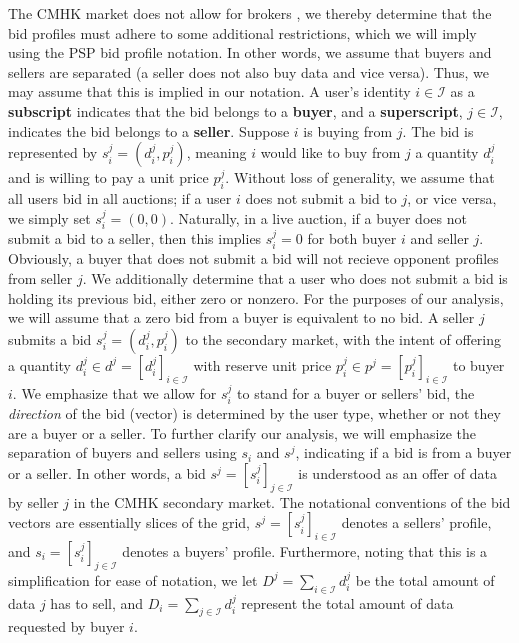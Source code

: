 \documentclass[12pt]{article}
\theoremstyle{definition}
\newcommand{\mcI}{\mathcal{I}}
\begin{document}
\begin{multicols}{2}
The CMHK market does not allow for brokers \cite{cmhk}, we thereby determine that
the bid profiles must adhere to some additional restrictions, which we will
imply using the PSP bid profile notation. In other words, we assume that buyers and sellers are
separated (a seller does not also buy data and vice versa). Thus, we may assume
that this is implied in our notation.
A user's identity $i \in \mcI$ as a \textbf{subscript} indicates that the bid
belongs to a \textbf{buyer}, and a \textbf{superscript}, $j\in\mcI$, indicates
the bid belongs to a \textbf{seller}.
Suppose $i$ is buying from $j$. The bid is represented by $s_i^j = (d_i^j, p_i^j)$, 
meaning $i$ would like to buy from $j$ a quantity $d^j_i$ and is willing to pay
a unit price $p^j_i$. Without loss of generality, we assume that all users bid in all
auctions; if a user $i$ does not submit a bid to $j$, or vice versa, we simply set $s_i^j =
(0,0)$. Naturally, in a live auction, if a buyer does
not submit a bid to a seller, then this implies $s_i^j = 0$ for both buyer $i$
and seller $j$. Obviously, a buyer that does not submit a bid will not recieve opponent profiles from seller
$j$. We additionally determine that a user who does not submit a bid is holding
its previous bid, either zero or nonzero. For the purposes of our analysis, we will assume that a zero bid from a
buyer is equivalent to no bid.
A seller $j$ submits a bid $s_i^j = (d_i^j, p_i^j)$ to the secondary market,
with the intent of offering a
quantity $d_i^j \in d^j = [d_i^j]_{i\in\mcI}$ 
with reserve unit price $p_i^j \in p^j = [p_i^j]_{i\in\mcI}$ to buyer $i$. We emphasize that we allow for $s_i^j$ to
stand for a buyer or sellers' bid, the \emph{direction} of the bid (vector) is determined
by the user type, whether or not they are  a buyer or a seller. 
To further clarify our analysis, we will emphasize the separation of buyers and
sellers using
$s_i$ and $s^j$, indicating if a bid is from a buyer or a seller.
In other words, a bid $s^j =
[s_i^j]_{j\in\mcI}$ is understood as an offer of data by seller $j$ in the CMHK
secondary market. The notational conventions of the bid vectors are essentially 
slices of the grid, $s^j = [s_i^j]_{i\in\mcI}$ denotes a sellers' profile, and $s_i =
[s_i^j]_{j\in\mcI}$ denotes a buyers' profile. 
Furthermore, noting that this is a simplification for ease of notation, we let $D^j = \sum_{i\in\mcI}
d_i^j$ be the total amount of data $j$ has to sell, and $D_i = \sum_{j\in\mcI}
d_i^j$ represent the
total amount of data requested by buyer $i$. 


\end{multicols}
\end{document}
